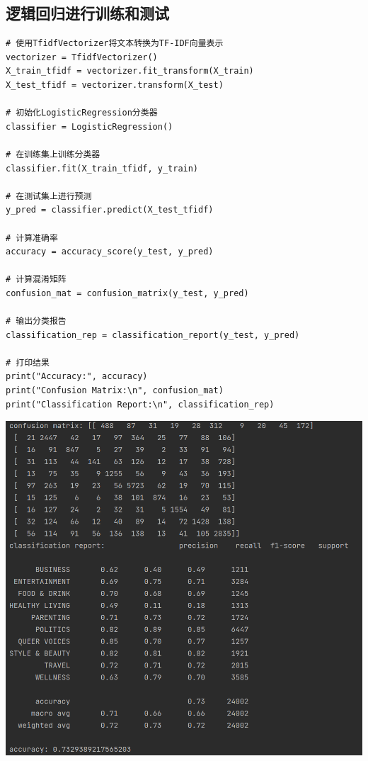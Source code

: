 \documentclass{article}
\begin{document}
\subsection{逻辑回归进行训练和测试}
\begin{lstlisting}
# 使用TfidfVectorizer将文本转换为TF-IDF向量表示
vectorizer = TfidfVectorizer()
X_train_tfidf = vectorizer.fit_transform(X_train)
X_test_tfidf = vectorizer.transform(X_test)

# 初始化LogisticRegression分类器
classifier = LogisticRegression()

# 在训练集上训练分类器
classifier.fit(X_train_tfidf, y_train)

# 在测试集上进行预测
y_pred = classifier.predict(X_test_tfidf)

# 计算准确率
accuracy = accuracy_score(y_test, y_pred)

# 计算混淆矩阵
confusion_mat = confusion_matrix(y_test, y_pred)

# 输出分类报告
classification_rep = classification_report(y_test, y_pred)

# 打印结果
print("Accuracy:", accuracy)
print("Confusion Matrix:\n", confusion_mat)
print("Classification Report:\n", classification_rep)
\end{lstlisting}
\begin{center}
    \includegraphics[width=1\linewidth]{3.png}
\end{center}
\end{document}
